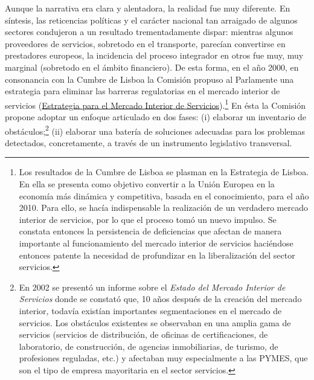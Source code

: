 \documentclass[10pt,a4paper]{article}
\begin{document}
Aunque la narrativa era clara y alentadora, la realidad fue muy diferente. En síntesis, las reticencias políticas y el carácter nacional tan arraigado de algunos sectores condujeron a un resultado trementadamente dispar: mientras algunos proveedores de servicios, sobretodo en el transporte, parecían convertirse en prestadores europeos, la incidencia del proceso integrador en otros fue muy, muy marginal (sobretodo en el ámbito financiero). De esta forma, en el año 2000, en consonancia con la Cumbre de Lisboa la Comisión propuso al Parlamente una estrategia para eliminar las barreras regulatorias en el mercado interior de servicios (\href{https://eur-lex.europa.eu/LexUriServ/LexUriServ.do?uri=COM:2000:0888:FIN:ES:PDF}{Estrategia para el Mercado Interior de Servicios}).\footnote{%
    Los resultados de la Cumbre de Lisboa se plasman en la Estrategia de Lisboa. En ella se presenta como objetivo convertir a la Unión Europea en la economía más dinámica y competitiva, basada en el conocimiento, para el año 2010. Para ello, se hacía indispensable la realización de un verdadero mercado interior de servicios, por lo que el proceso tomó un nuevo impulso. Se constata entonces la persistencia de deficiencias que afectan de manera importante al funcionamiento del mercado interior de servicios haciéndose entonces patente la necesidad de profundizar en la liberalización del sector servicios.
} En ésta la Comisión propone adoptar un enfoque articulado en dos fases: (i) elaborar un inventario de obstáculos;\footnote{%
    En 2002 se presentó un informe sobre el \textit{Estado del Mercado Interior de Servicios} donde se constató que, 10 años después de la creación del mercado interior, todavía existían importantes segmentaciones en el mercado de servicios. Los obstáculos existentes se observaban en una amplia gama de servicios (servicios de distribución, de oficinas de certificaciones, de laboratorio, de construcción, de agencias inmobiliarias, de turismo, de profesiones reguladas, etc.) y afectaban muy especialmente a las PYMES, que son el tipo de empresa mayoritaria en el sector servicios.
} (ii) elaborar una batería de soluciones adecuadas para los problemas detectados, concretamente, a través de un instrumento legislativo transversal.
\end{document}

